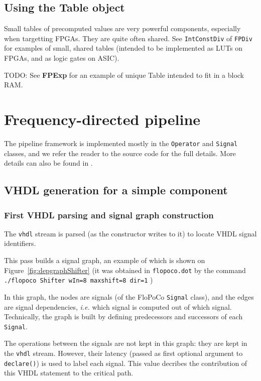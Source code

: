 \documentclass{article}
\begin{document}
\subsection{Using the Table object}
Small tables of precomputed values are very powerful components, especially when targetting FPGAs.
They are quite often shared.
See \texttt{IntConstDiv} of \texttt{FPDiv} for examples of small, shared tables (intended to be implemented as LUTs on FPGAs, and as logic gates on ASIC).

TODO: See \textbf{FPExp} for an example of unique Table intended to fit in a block RAM.


\section{Frequency-directed pipeline}

The  pipeline framework  is implemented mostly in the \texttt{Operator} and \texttt{Signal} classes, and we refer the reader to the source code for the full  details.
More details can also be found in \cite{istoan:hal-01373937}.

\subsection{VHDL generation for a simple component}

\subsubsection{First VHDL parsing and signal graph construction}
The \texttt{vhdl} stream is parsed (as the constructor writes to it) to locate VHDL signal identifiers.

This pass builds  a signal graph, an example of which is shown on Figure~\ref{fig:depgraphShifter} 
(it was obtained in \texttt{flopoco.dot} by the command
\verb!./flopoco Shifter wIn=8 maxshift=8 dir=1! )

In this graph, the nodes are signals (of the FloPoCo \texttt{Signal} class), and the edges are signal dependencies, \emph{i.e.} which signal is computed out of which signal.
Technically, the graph is built by defining predecessors and successors of each \texttt{Signal}.

The operations between the signals are not kept in this graph: they are kept in the \texttt{vhdl} stream.
  However, their latency (passed as first optional argument to  \texttt{declare()}) is used to label each signal.
  This value decribes the contribution of this VHDL statement to the critical path.
\end{document}
